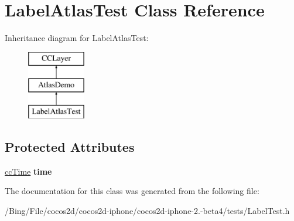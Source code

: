 \hypertarget{interface_label_atlas_test}{\section{Label\-Atlas\-Test Class Reference}
\label{interface_label_atlas_test}
}
Inheritance diagram for Label\-Atlas\-Test\-:\begin{figure}[H]
\begin{center}
\leavevmode
\includegraphics[height=3.000000cm]{interface_label_atlas_test}
\end{center}
\end{figure}
\subsection*{Protected Attributes}
\begin{DoxyCompactItemize}
\item 
\hypertarget{interface_label_atlas_test_acd05736a5e85b54d023ef2b518abc2c9}{\hyperlink{cc_types_8h_ae6c674aac4bfb46a4e6cb1e89bb66b4f}{cc\-Time} {\bfseries time}}\label{interface_label_atlas_test_acd05736a5e85b54d023ef2b518abc2c9}

\end{DoxyCompactItemize}


The documentation for this class was generated from the following file\-:\begin{DoxyCompactItemize}
\item 
/\-Bing/\-File/cocos2d/cocos2d-\/iphone/cocos2d-\/iphone-\/2.-\/beta4/tests/Label\-Test.\-h\end{DoxyCompactItemize}
